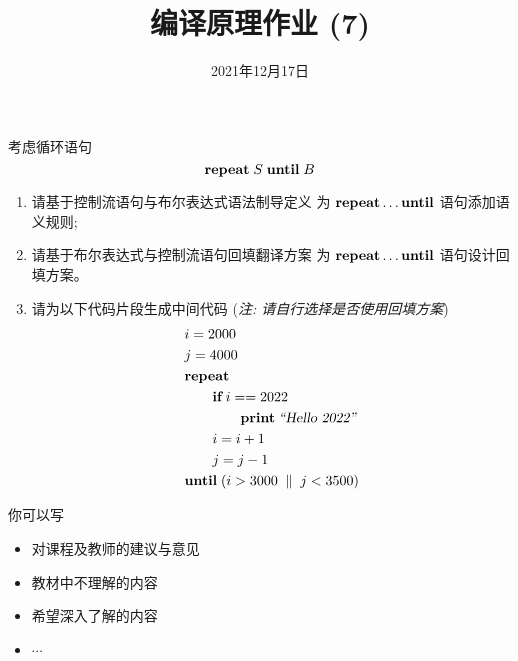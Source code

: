 \documentclass[a4paper, justified]{tufte-handout}
\title{编译原理作业 (7)}
\date{2021年12月17日}
\begin{document}
\maketitle
\noplagiarism %
\begin{abstract}
\end{abstract}
\beginrequired

\begin{problem}[\score{20 = 5 + 10 + 5}]
  考虑循环语句
  \[
    \text{\bf repeat}\; S\; \text{\bf until}\; B
  \]
  \begin{enumerate}[(1)]
    \item 请基于控制流语句与布尔表达式语法制导定义
      为 $\text{\bf repeat}{} \dots \text{\bf until}$ 语句添加语义规则;
    \item 请基于布尔表达式与控制流语句回填翻译方案
      为 $\text{\bf repeat}{} \dots \text{\bf until}$ 语句设计回填方案。
    \item 请为以下代码片段生成中间代码 ({\it 注\emph{:} 请自行选择是否使用回填方案})
      \begin{align*}
        & i = 2000 \\
        & j = 4000 \\
        &\text{\bf repeat} \\
          &\qquad \text{\bf if}\; i == 2022\; \\
          &\qquad\qquad \text{\bf print}\; {\textsl{``Hello 2022''}} \\
          &\qquad i = i + 1 \\
          &\qquad j = j - 1 \\
        &\text{\bf until}\; (i > 3000 \;\parallel\; j < 3500)
      \end{align*}
  \end{enumerate}
\end{problem}

\begin{solution}
\end{solution}



\beginfb

你可以写
\begin{itemize}
  \item 对课程及教师的建议与意见
  \item 教材中不理解的内容
  \item 希望深入了解的内容
  \item $\cdots$
\end{itemize}
\end{document}
